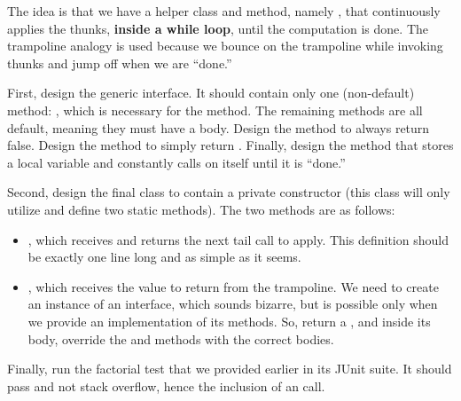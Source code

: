 The idea is that we have a helper class and method, namely , that continuously applies the thunks, \textbf{inside a while loop}, until the computation is done. The trampoline analogy is used because we bounce on the trampoline while invoking thunks and jump off when we are ``done.''

First, design the generic  interface. It should contain only one (non-default) method: , which is necessary for the  method. The remaining methods are all default, meaning they must have a body. Design the  method to always return false. Design the  method to simply return . Finally, design the  method that stores a local variable and constantly calls  on itself until it is ``done.'' 

Second, design the  final class to contain a private constructor (this class will only utilize and define two static methods). The two methods are as follows:

\begin{itemize}
  \item {}, which receives and returns the next tail call to apply. This definition should be exactly one line long and as simple as it seems.
  \item {}, which receives the value to return from the trampoline. We need to create an instance of an interface, which sounds bizarre, but is possible only when we provide an implementation of its methods. So, return a , and inside its body, override the  and  methods with the correct bodies.
\end{itemize}

Finally, run the factorial test that we provided earlier in its JUnit suite. It should pass and not stack overflow, hence the inclusion of an  call.

\newpage %

